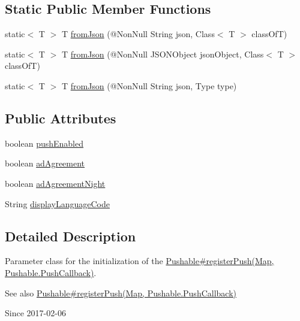 \subsection*{Static Public Member Functions}
\begin{DoxyCompactItemize}
\item 
static$<$ T $>$ T \hyperlink{classcom_1_1toast_1_1android_1_1gamebase_1_1base_1_1_value_object_ae6655c88c20a9a8406dc11b46250ac7b}{from\+Json} (@Non\+Null String json, Class$<$ T $>$ class\+OfT)
\item 
static$<$ T $>$ T \hyperlink{classcom_1_1toast_1_1android_1_1gamebase_1_1base_1_1_value_object_ab83c4196ee2e3f11553bbe0f04dc2101}{from\+Json} (@Non\+Null J\+S\+O\+N\+Object json\+Object, Class$<$ T $>$ class\+OfT)
\item 
static$<$ T $>$ T \hyperlink{classcom_1_1toast_1_1android_1_1gamebase_1_1base_1_1_value_object_aa901d97d495150b54bcb80c05672f58a}{from\+Json} (@Non\+Null String json, Type type)
\end{DoxyCompactItemize}
\subsection*{Public Attributes}
\begin{DoxyCompactItemize}
\item 
boolean \hyperlink{classcom_1_1toast_1_1android_1_1gamebase_1_1base_1_1push_1_1_push_configuration_a6cb5840fefbcd01e810f92e3a270e373}{push\+Enabled}
\item 
boolean \hyperlink{classcom_1_1toast_1_1android_1_1gamebase_1_1base_1_1push_1_1_push_configuration_a47f216175d1e29d238388ed44cd36b5e}{ad\+Agreement}
\item 
boolean \hyperlink{classcom_1_1toast_1_1android_1_1gamebase_1_1base_1_1push_1_1_push_configuration_a00e836027263a722a6bbc61dda11335d}{ad\+Agreement\+Night}
\item 
String \hyperlink{classcom_1_1toast_1_1android_1_1gamebase_1_1base_1_1push_1_1_push_configuration_a4275e397239a0159905fcc9673788246}{display\+Language\+Code}
\end{DoxyCompactItemize}


\subsection{Detailed Description}
Parameter class for the initialization of the \hyperlink{}{Pushable\#register\+Push(\+Map, Pushable.\+Push\+Callback)}. 

\begin{DoxySeeAlso}{See also}
\hyperlink{}{Pushable\#register\+Push(\+Map, Pushable.\+Push\+Callback)} 
\end{DoxySeeAlso}
\begin{DoxySince}{Since}
2017-\/02-\/06 
\end{DoxySince}


